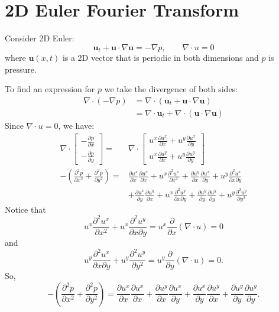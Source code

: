 \documentclass[12pt]{article}
\begin{document}
\section*{2D Euler Fourier Transform}

Consider 2D Euler:
\[
\mathbf{u}_t+\mathbf{u}\cdot\nabla\mathbf{u}=-\nabla{p},\qquad\nabla\cdot{u}=0
\]
\noindent where $\mathbf{u}(x,t)$ is a 2D vector that is periodic in both dimensions and $p$ is pressure.

To find an expression for $p$ we take the divergence of both sides:
\begin{align*}
    \nabla\cdot(-\nabla{p})
    &=\nabla\cdot(\mathbf{u}_t+\mathbf{u}\cdot\nabla\mathbf{u})\\
    &=\nabla\cdot\mathbf{u}_t+\nabla\cdot(\mathbf{u}\cdot\nabla\mathbf{u})
\end{align*}
Since $\nabla\cdot{u}=0$, we have:
\begin{align*}
    \nabla\cdot\begin{bmatrix}-\frac{\partial{p}}{\partial{x}}\\-\frac{\partial{p}}{\partial{y}}\end{bmatrix}
    =&\nabla\cdot\begin{bmatrix}u^x\frac{\partial{u}^x}{\partial{x}}+u^y\frac{\partial{u}^x}{\partial{y}}\\
    u^x\frac{\partial{u}^y}{\partial{x}}+u^y\frac{\partial{u}^y}{\partial{y}}\end{bmatrix}\\
    -\left(\frac{\partial^2p}{\partial{x}^2}+\frac{\partial^2p}{\partial{y}^2}\right)
    =&\frac{\partial{u}^x}{\partial{x}}\frac{\partial{u}^x}{\partial{x}}+u^x\frac{\partial^2u^x}{\partial{x}^2}+\frac{\partial{u}^y}{\partial{x}}\frac{\partial{u}^x}{\partial{y}}+u^y\frac{\partial^2u^x}{\partial{x}\partial{y}}\\
    &+\frac{\partial{u}^x}{\partial{y}}\frac{\partial{u}^y}{\partial{x}}+u^x\frac{\partial^2u^y}{\partial{x}\partial{y}}+\frac{\partial{u}^y}{\partial{y}}\frac{\partial{u}^y}{\partial{y}}+u^y\frac{\partial^2u^y}{\partial{y}^2}
\end{align*}
Notice that
\[
u^x\frac{\partial^2u^x}{\partial{x}^2}+u^x\frac{\partial^2u^y}{\partial{x}\partial{y}}=u^x\frac{\partial}{\partial{x}}(\nabla\cdot{u})=0
\]
and
\[
u^y\frac{\partial^2u^x}{\partial{x}\partial{y}}+u^y\frac{\partial^2u^y}{\partial{y}^2}=u^y\frac{\partial}{\partial{y}}(\nabla\cdot{u})=0.
\]
So,
\[
    -\left(\frac{\partial^2p}{\partial{x}^2}+\frac{\partial^2p}{\partial{y}^2}\right)
    =\frac{\partial{u}^x}{\partial{x}}\frac{\partial{u}^x}{\partial{x}}+\frac{\partial{u}^y}{\partial{x}}\frac{\partial{u}^x}{\partial{y}}+\frac{\partial{u}^x}{\partial{y}}\frac{\partial{u}^y}{\partial{x}}+\frac{\partial{u}^y}{\partial{y}}\frac{\partial{u}^y}{\partial{y}}.
\]
\end{document}
